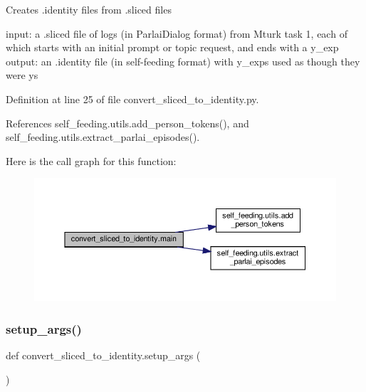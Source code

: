 \begin{DoxyVerb}Creates .identity files from .sliced files

input: a .sliced file of logs (in ParlaiDialog format) from Mturk task 1, each of
    which starts with an initial prompt or topic request, and ends with a y_exp
output: an .identity file (in self-feeding format) with y_exps used as though they
    were ys
\end{DoxyVerb}
 

Definition at line 25 of file convert\+\_\+sliced\+\_\+to\+\_\+identity.\+py.



References self\+\_\+feeding.\+utils.\+add\+\_\+person\+\_\+tokens(), and self\+\_\+feeding.\+utils.\+extract\+\_\+parlai\+\_\+episodes().

Here is the call graph for this function\+:
\nopagebreak
\begin{figure}[H]
\begin{center}
\leavevmode
\includegraphics[width=350pt]{namespaceconvert__sliced__to__identity_ace07c7ec4abee6320d35f7aea3c9a293_cgraph}
\end{center}
\end{figure}
\mbox{\label{namespaceconvert__sliced__to__identity_a9f82ac7f79fa007df39d00659e714fe9}} 
\subsubsection{\texorpdfstring{setup\+\_\+args()}{setup\_args()}}
{\footnotesize\ttfamily def convert\+\_\+sliced\+\_\+to\+\_\+identity.\+setup\+\_\+args (\begin{DoxyParamCaption}{ }\end{DoxyParamCaption})}



